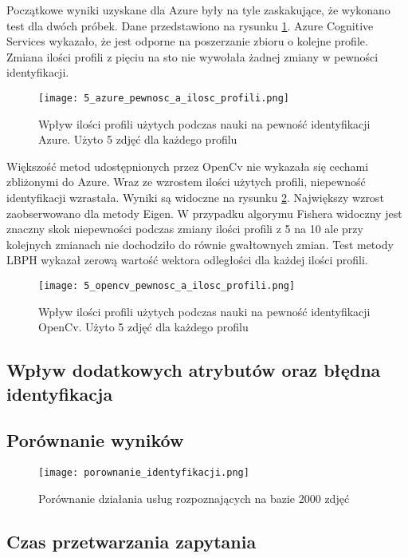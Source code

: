 Początkowe wyniki uzyskane dla Azure były na tyle zaskakujące, że wykonano test dla dwóch próbek. Dane przedstawiono na rysunku \ref{fig:azure_5__profile}. Azure Cognitive Services wykazało, że jest odporne na poszerzanie zbioru o kolejne profile. Zmiana ilości profili z pięciu na sto nie wywołała żadnej zmiany w pewności identyfikacji.
\begin{figure}[H]
	\centering
	\texttt{[image: 5\_azure\_pewnosc\_a\_ilosc\_profili.png]}
	\caption{Wpływ ilości profili użytych podczas nauki na pewność identyfikacji Azure. Użyto 5 zdjęć dla każdego profilu}
	\label{fig:azure_5__profile}
\end{figure}
Większość metod udostępnionych przez OpenCv nie wykazała się cechami zbliżonymi do Azure. Wraz ze wzrostem ilości użytych profili, niepewność identyfikacji wzrastała. Wyniki są widoczne na rysunku \ref{fig:opencv_5__profile}. Największy wzrost zaobserwowano dla metody Eigen. W przypadku algorymu Fishera widoczny jest znaczny skok niepewności podczas zmiany ilości profili z 5 na 10 ale przy kolejnych zmianach nie dochodziło do równie gwałtownych zmian. Test metody LBPH wykazał zerową wartość wektora odległości dla każdej ilości profili.
\begin{figure}[H]
	\centering
	\texttt{[image: 5\_opencv\_pewnosc\_a\_ilosc\_profili.png]}
	\caption{Wpływ ilości profili użytych podczas nauki na pewność identyfikacji OpenCv. Użyto 5 zdjęć dla każdego profilu}
	\label{fig:opencv_5__profile}
\end{figure}

\subsection{Wpływ dodatkowych atrybutów oraz błędna identyfikacja}

\subsection{Porównanie wyników}
\begin{figure}[H]
	\centering
	\texttt{[image: porownanie\_identyfikacji.png]}
	\caption{Porównanie działania usług rozpoznających na bazie 2000 zdjęć}
	\label{fig:porownanie_identyfikator}
\end{figure}


\subsection{Czas przetwarzania zapytania}

